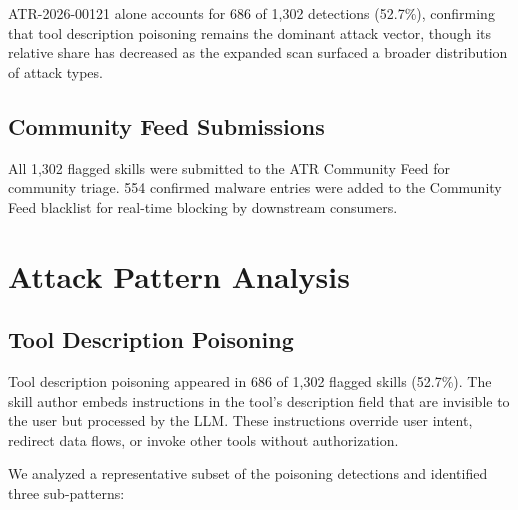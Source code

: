 \documentclass[letterpaper,twocolumn,10pt]{article}
\begin{document}
ATR-2026-00121 alone accounts for 686 of 1,302 detections (52.7\%),
confirming that tool description poisoning remains the dominant attack
vector, though its relative share has decreased as the expanded scan
surfaced a broader distribution of attack types.

\subsection{Community Feed Submissions}

All 1,302 flagged skills were submitted to the ATR Community Feed for
community triage.  554 confirmed malware entries were added to the
Community Feed blacklist for real-time blocking by downstream consumers.

%

\section{Attack Pattern Analysis}
\label{sec:patterns}

\subsection{Tool Description Poisoning}
\label{sec:poisoning}

Tool description poisoning appeared in 686 of 1,302 flagged skills
(52.7\%).  The skill author embeds instructions in the tool's description
field that are invisible to the user but processed by the LLM.  These
instructions override user intent, redirect data flows, or invoke other
tools without authorization.

We analyzed a representative subset of the poisoning detections and
identified three sub-patterns:
\end{document}
